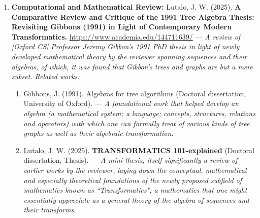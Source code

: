 \documentclass[a4paper]{article}
\begin{document}
\begin{enumerate}
{\begin{enumerate}
\item Geoﬀrey Mallin Clarke and Dennis Cooke. A Basic Course in Statistics—3rd 
Ed. Edward Arnold, 1992. --- \textit{A fine introductory text on college-level mathematical statistics.}
\item Lutalo, J. W. (2025). \textbf{A Meta-Review of The Philosophical and Mathematical Foundations of The Number Generating Theory (NGT) and The Lu-Number System, LNS.} --- \textit{A review of both earlier work on LNS as well as further commentary courtesy of Professor Terry Lyons (Oxford), concerning potential use of the proposed Lu-Numbers in not only RNGs but also modeling general kinds of artificial intelligence and machine learning tasks among others.}
\end{enumerate}

}

\item { \textbf{Computational and Mathematical Review:} Lutalo, J. W. (2025). \textbf{A Comparative Review and Critique of the 1991 Tree Algebra Thesis: Revisiting Gibbons (1991) in Light of Contemporary Modern Transformatics.} \url{https://www.academia.edu/144711639/} --- \textit{A review of [Oxford CS] Professor Jeremy Gibbon's 1991 PhD thesis in light of newly developed mathematical theory by the reviewer spanning sequences and their algebras, of which, it was found that Gibbon's trees and graphs are but a mere subset. Related works:}

\begin{enumerate}
\item Gibbons, J. (1991). Algebras for tree algorithms (Doctoral dissertation, University of Oxford). --- \textit{A foundational work that helped develop an algebra (a mathematical system; a language; concepts, structures, relations and operators) with which one can formally treat of various kinds of tree graphs as well as their algebraic transformation.}
\item Lutalo, J. W. (2025). \textbf{TRANSFORMATICS 101-explained} (Doctoral dissertation, Thesis). --- \textit{A mini-thesis, itself significantly a review of earlier works by the reviewer, laying down the conceptual, mathematical and especially theoretical foundations of the newly proposed subfield of mathematics known as ``Transformatics"; a mathematics that one might essentially appreciate as a general theory of the algebra of sequences and their transforms.}
\end{enumerate}

}
\end{enumerate}
\end{document}
